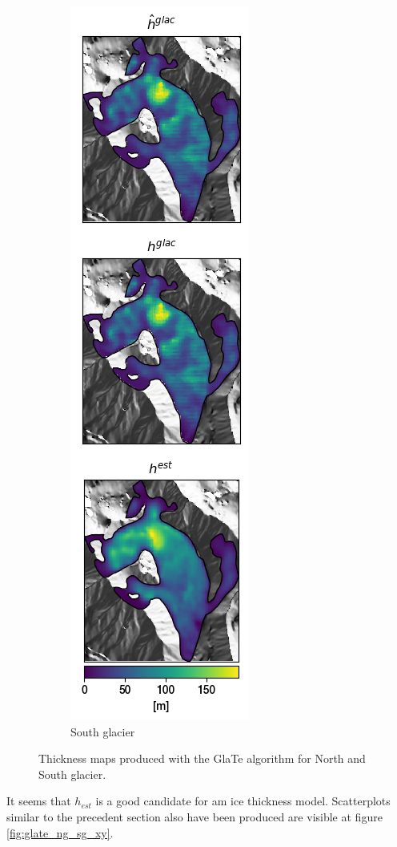 \documentclass[a4, 12pt]{article}
\begin{document}
\begin{figure}[h!]
{\begin{subfigure}{0.35\linewidth}
\includegraphics{../imgs/South glacier/glate_thickness_all_models.png}
\caption{South glacier}
\label{fig:glate_sg_thickness}
\end{subfigure}
}
\caption{Thickness maps produced with the GlaTe algorithm for North and South glacier.}
\label{fig:glate_ng_sg_thickness}
\end{figure}
It seems that $h_{est}$ is a good candidate for am ice thickness model. Scatterplots similar to the precedent section also have been produced are visible at figure \ref{fig:glate_ng_sg_xy}.\\
\end{document}
